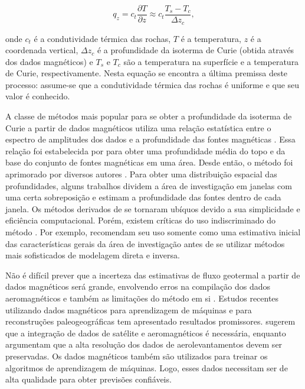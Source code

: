 \documentclass[12pt,a4paper,oneside]{book}
\begin{document}
\begin{equation}
  q_z = c_t \dfrac{\partial T}{\partial z} \approx c_t \dfrac{T_s - T_c}{\Delta z_c},
\end{equation}

\noindent
onde $c_t$ é a condutividade térmica das rochas, $T$ é a temperatura, $z$ é a
coordenada vertical, $\Delta z_c$ é a profundidade da isoterma de Curie (obtida
através dos dados magnéticos) e $T_s$ e $T_c$ são a temperatura na superfície e
a temperatura de Curie, respectivamente.
Nesta equação se encontra a última premissa deste processo: assume-se que a
condutividade térmica das rochas é uniforme e que seu valor é conhecido.

A classe de métodos mais popular para se obter a profundidade da isoterma de
Curie a partir de dados magnéticos utiliza uma relação estatística entre o
espectro de amplitudes dos dados e a profundidade das fontes magnéticas
\citep{BurtonJohnson2020}.
Essa relação foi estabelecida por \citet{Spector1970} para obter uma
profundidade média do topo e da base do conjunto de fontes magnéticas em uma
área.
Desde então, o método foi aprimorado por diversos autores \citep[uma revisão
dos métodos e suas limitações pode ser encontrada em ][]{NunezDemarco2020}.
Para obter uma distribuição espacial das profundidades, alguns trabalhos
dividem a área de investigação em janelas com uma certa sobreposição e estimam
a profundidade das fontes dentro de cada janela.
Os métodos derivados de \citet{Spector1970} se tornaram ubíquos devido a sua
simplicidade e eficiência computacional.
Porém, existem críticas do uso indiscriminado do método
\citep{Johnson2016,NunezDemarco2020}.
Por exemplo, \citet{Johnson2016} recomendam seu uso somente como uma estimativa
inicial das características gerais da área de investigação antes de se utilizar
métodos mais sofisticados de modelagem direta e inversa.

Não é difícil prever que a incerteza das estimativas de fluxo geotermal a
partir de dados magnéticos será grande, envolvendo erros na compilação dos
dados aeromagnéticos e também as limitações do método em si
\citep{BurtonJohnson2020}.
Estudos recentes utilizando dados magnéticos para aprendizagem de máquinas
\citep{Losing2021} e para reconstruções paleogeográficas \citep{Ebbing2021} tem
apresentado resultados promissores.
\citet{Ebbing2021} sugerem que a integração de dados de satélite e
aeromagnéticos é necessária, enquanto \citet{Lowe2023} argumentam que a alta
resolução dos dados de aerolevantamentos devem ser preservadas.
Os dados magnéticos também são utilizados para treinar os algoritmos de
aprendizagem de máquinas.
Logo, esses dados necessitam ser de alta qualidade para obter previsões
confiáveis.
\end{document}
